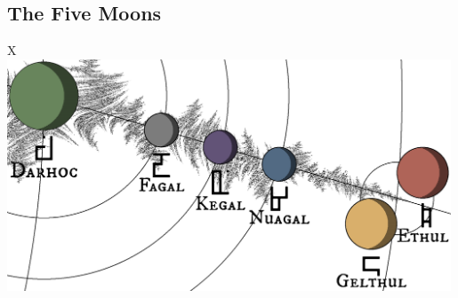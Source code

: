 \subsection*{The Five Moons}

\begin{table}[b]%
    \begin{DndTable}[width=\linewidth]{X}
        \centering
        \includegraphics[width=0.99\textwidth]{01yuadrem/img/40moons.png}
    \end{DndTable}
\end{table}

\newpage~\newpage
